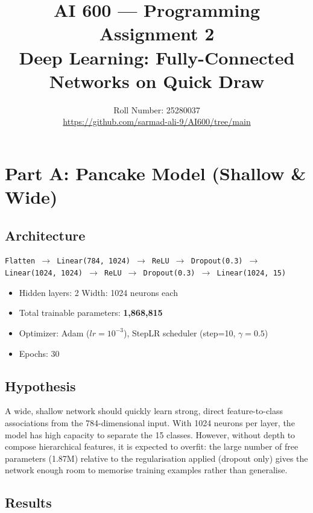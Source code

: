 \documentclass[11pt,a4paper]{article}
\title{\textbf{AI 600 — Programming Assignment 2}\\
\large Deep Learning: Fully-Connected Networks on Quick Draw}
\author{Roll Number: 25280037 \\[4pt]
\small\href{https://github.com/sarmad-ali-9/AI600/tree/main}{https://github.com/sarmad-ali-9/AI600/tree/main}}
\date{}
\begin{document}
\maketitle
\tableofcontents
\newpage

\section{Part A: Pancake Model (Shallow \& Wide)}

\subsection{Architecture}

\begin{center}
\texttt{Flatten $\to$ Linear(784, 1024) $\to$ ReLU $\to$ Dropout(0.3) $\to$ Linear(1024, 1024) $\to$ ReLU $\to$ Dropout(0.3) $\to$ Linear(1024, 15)}
\end{center}

\begin{itemize}[noitemsep]
    \item Hidden layers: 2 \quad Width: 1024 neurons each
    \item Total trainable parameters: \textbf{1,868,815}
    \item Optimizer: Adam ($lr = 10^{-3}$), StepLR scheduler (step=10, $\gamma=0.5$)
    \item Epochs: 30
\end{itemize}

\subsection{Hypothesis}

A wide, shallow network should quickly learn strong, direct feature-to-class associations from the 784-dimensional input. With 1024 neurons per layer, the model has high capacity to separate the 15 classes. However, without depth to compose hierarchical features, it is expected to overfit: the large number of free parameters (1.87M) relative to the regularisation applied (dropout only) gives the network enough room to memorise training examples rather than generalise.

\subsection{Results}
\end{document}
